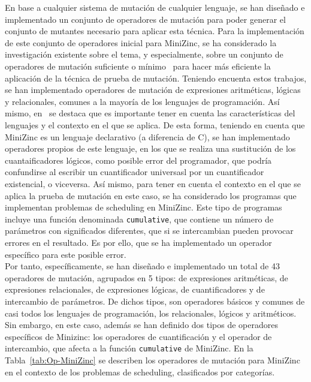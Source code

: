 En base a cualquier sistema de mutación de cualquier lenguaje, se han diseñado e implementado un conjunto de operadores de mutación para poder generar el conjunto de mutantes necesario para aplicar esta técnica.
Para la implementación de este conjunto de operadores inicial para MiniZinc, se ha considerado la investigación existente sobre el tema, y especialmente,  sobre un conjunto de operadores de mutación suficiente o mínimo~\cite{Offutt96OpMut,Mresa99OpMut,PapadakisM10} para hacer más eficiente la aplicación de la técnica de prueba de mutación. Teniendo encuenta estos trabajos, se han implementado operadores de mutación de expresiones aritméticas, lógicas y relacionales, comunes  a la mayoría de los lenguajes de programación. Así mismo, en~\cite{Mresa99OpMut} se destaca que es importante tener en cuenta las características del lenguajes y el contexto en el que se aplica. De esta forma, teniendo en cuenta que MiniZinc es un lenguaje declarativo (a diferencia de C), se han implementado operadores propios de este lenguaje, en los que se realiza una sustitución de los cuantaificadores lógicos, como posible error del programador, que podría confundirse al escribir un cuantificador universasl por un cuantificador existencial, o viceversa.  Así mismo, para tener en cuenta el contexto en el que se aplica la prueba de mutación en este caso, se ha considerado los programas que implementan problemas de scheduling en MiniZinc. Este tipo de programas incluye una función denominada \texttt{cumulative}, que contiene un número de parámetros con significados diferentes, que si se intercambian pueden provocar errores en el resultado. Es por ello, que se ha implementado un operador específico para este posible error.\\

Por tanto, específicamente, se han diseñado e implementado un total de 43 operadores de mutación, agrupados en 5 tipos: de expresiones aritméticas, de expresiones relacionales, de expresiones lógicas, de cuantificadores y de intercambio de parámetros. De dichos tipos, son operadores básicos y comunes de casi todos los lenguajes de programación, los relacionales, lógicos y aritméticos. Sin embargo, en este caso, además se han definido dos tipos de operadores específicos de Minizinc: los operadores de cuantificación y el operador de intercambio, que afecta a la función \texttt{cumulative} de MiniZinc. En la Tabla~\ref{tab:Op-MiniZinc} se describen los operadores de mutación para MiniZinc en el contexto de los problemas de scheduling, clasificados por categorías.


